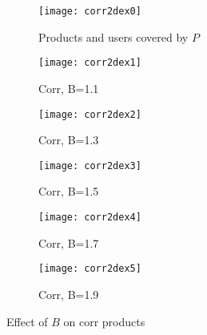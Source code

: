 \begin{figure}[ht!]
  \centering
  \begin{subfigure}[b]{0.45\linewidth}
    \texttt{[image: corr2dex0]}
    \caption{Products and users covered by $P$}
    \label{cover_corr}
  \end{subfigure}
  \begin{subfigure}[b]{0.45\linewidth}
    \texttt{[image: corr2dex1]}
    \caption{Corr, B=1.1}
    \label{it_corr_1_1}
  \end{subfigure}
  \begin{subfigure}[b]{0.45\linewidth}
    \texttt{[image: corr2dex2]}
    \caption{Corr, B=1.3}
    \label{it_corr_1_3}
  \end{subfigure}
  \begin{subfigure}[b]{0.45\linewidth}
    \texttt{[image: corr2dex3]}
    \caption{Corr, B=1.5}
    \label{it_corr_1_5}
  \end{subfigure}
  \begin{subfigure}[b]{0.45\linewidth}
    \texttt{[image: corr2dex4]}
    \caption{Corr, B=1.7}
    \label{it_corr_1_7}
  \end{subfigure}
  \begin{subfigure}[b]{0.45\linewidth}
    \texttt{[image: corr2dex5]}
    \caption{Corr, B=1.9}
    \label{it_corr_1_9}
  \end{subfigure}
  \caption{Effect of $B$ on corr products}
  \label{corr_2d_demo}
\end{figure}

